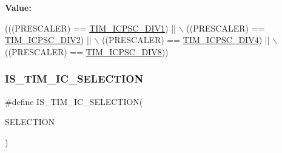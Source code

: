 {\bfseries Value\+:}
\begin{DoxyCode}
(((PRESCALER) == \mbox{\hyperlink{group___t_i_m___input___capture___prescaler_ga8acb44abe3147d883685c1f9f1ce410e}{TIM\_ICPSC\_DIV1}}) || \(\backslash\)
                                        ((PRESCALER) == \mbox{\hyperlink{group___t_i_m___input___capture___prescaler_ga1d8a7b66add914e2ddd910d2d700978f}{TIM\_ICPSC\_DIV2}}) || \(\backslash\)
                                        ((PRESCALER) == \mbox{\hyperlink{group___t_i_m___input___capture___prescaler_gaf5a675046430fa0f0c95b0dac612828f}{TIM\_ICPSC\_DIV4}}) || \(\backslash\)
                                        ((PRESCALER) == \mbox{\hyperlink{group___t_i_m___input___capture___prescaler_ga5086cb03c89a5c67b199d20b605f00cb}{TIM\_ICPSC\_DIV8}}))
\end{DoxyCode}
\mbox{\label{group___t_i_m___i_s___t_i_m___definitions_ga623d8592109f4702829ae7fc3806bcb8}} 
\subsubsection{\texorpdfstring{I\+S\+\_\+\+T\+I\+M\+\_\+\+I\+C\+\_\+\+S\+E\+L\+E\+C\+T\+I\+ON}{IS\_TIM\_IC\_SELECTION}}
{\footnotesize\ttfamily \#define I\+S\+\_\+\+T\+I\+M\+\_\+\+I\+C\+\_\+\+S\+E\+L\+E\+C\+T\+I\+ON(\begin{DoxyParamCaption}\item[{}]{S\+E\+L\+E\+C\+T\+I\+ON }\end{DoxyParamCaption})}


